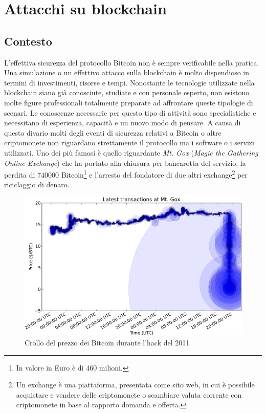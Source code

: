 \chapter{Attacchi su blockchain}

\section{Contesto}
L'effettiva sicurezza del protocollo Bitcoin non è sempre verificabile nella pratica. Una simulazione o un effettivo attacco sulla blockchain è molto dispendioso in termini di investimenti, risorse e tempi. Nonostante le tecnologie utilizzate nella blockchain siano già conosciute, studiate e con personale esperto, non esistono molte figure professionali totalmente preparate ad affrontare queste tipologie di scenari. Le conoscenze necessarie per questo tipo di attività sono specialistiche e necessitano di esperienza, capacità e un nuovo modo di pensare. A causa di questo divario molti degli eventi di sicurezza relativi a Bitcoin o altre criptomonete non riguardano strettamente il protocollo ma i software o i servizi utilizzati. Uno dei più famosi è quello riguardante \textit{Mt. Gox} (\textit{Magic the Gathering Online Exchange}) che ha portato alla chiusura per bancarotta del servizio, la perdita di $740000$ Bitcoin\footnote{In valore in Euro è di 460 milioni.} e l'arresto del fondatore di due altri exchange\footnote{Un exchange è una piattaforma, presentata come sito web, in cui è possibile acquistare e vendere delle criptomonete o scambiare valuta corrente con criptomonete in base al rapporto domanda e offerta.} per riciclaggio di denaro.\newline
\begin{figure}
    \centering
    \includegraphics[width=\textwidth]{images/mtgox_cent.png}
    \caption{Crollo del prezzo dei Bitcoin durante l'hack del 2011}
\end{figure}
